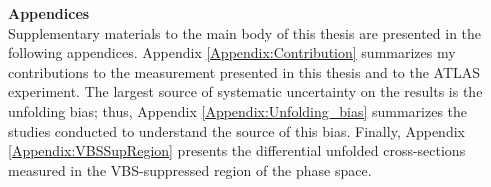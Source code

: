 \documentclass[red]{brandeis-dissertation}
\numberwithin{equation}{section}
\begin{document}
\startbody

\renewcommand{\partname}{Chapter}


\clearpage


	
	
	
	
\clearpage


	
	
	
	
\clearpage


	
	
	
	
	
	
\clearpage


\clearpage


\clearpage


\clearpage

% 
% 	
% 	

{\singlespacing
\renewcommand{\refname}{References}


\clearpage
}

\begin{appendices}
   \LARGE{\textbf{Appendices}} \\ 
   \normalsize 
	Supplementary materials to the main body of this thesis are presented in the following appendices. Appendix \ref{Appendix:Contribution} summarizes my contributions to the measurement presented in this thesis and to the ATLAS experiment. The largest source of systematic uncertainty on the results is the unfolding bias; thus, Appendix \ref{Appendix:Unfolding_bias} summarizes the studies conducted to understand the source of this bias. Finally, Appendix \ref{Appendix:VBSSupRegion} presents the differential unfolded cross-sections measured in the VBS-suppressed region of the phase space. 

	
\end{appendices}
\end{document}
